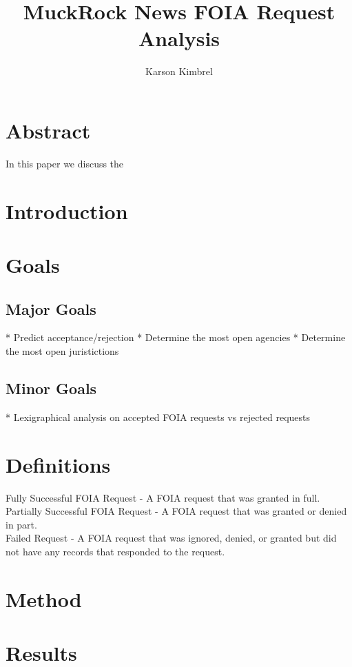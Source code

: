 \documentclass{article}
\title{MuckRock News FOIA Request Analysis}
\author{Karson Kimbrel}
\begin{document}
\pagestyle{empty}

\maketitle

\section{Abstract}
In this paper we discuss the 

\section{Introduction}


\section{Goals}


\subsection{Major Goals}
* Predict acceptance/rejection
* Determine the most open agencies
* Determine the most open juristictions

\subsection{Minor Goals}
* Lexigraphical analysis on accepted FOIA requests vs rejected requests

\section{Definitions}
Fully Successful FOIA Request - A FOIA request that was granted in full.\\
Partially Successful FOIA Request - A FOIA request that was granted or denied in part.\\
Failed Request - A FOIA request that was ignored, denied, or granted but did not have any records that responded to the request.\\

\section{Method}


\section{Results}
\end{document}

